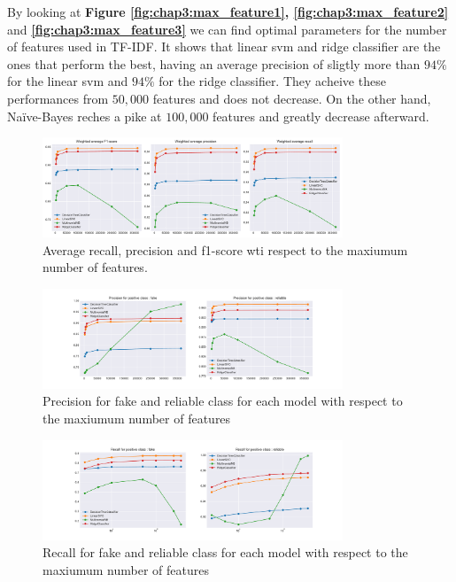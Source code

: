 By looking at \textbf{Figure \ref{fig:chap3:max_feature1}, \ref{fig:chap3:max_feature2}} and \textbf{\ref{fig:chap3:max_feature3}} we can find optimal parameters for the number of features used in TF-IDF. It shows that linear svm and ridge classifier are the ones that perform the best, having an average precision of sligtly more than $94\%$ for the linear svm and $94\%$ for the ridge classifier. They acheive these performances from $50,000$ features and does not decrease. On the other hand, Na\"{i}ve-Bayes reches a pike at $100,000$ features and greatly decrease afterward. \\

\begin{figure}
	\centering
	\includegraphics[width=0.8\textwidth]{images/chapitre3/ML_fake_average}
	\caption{Average recall, precision and f1-score wti respect to the maxiumum number of features.}
	\label{fig:chap3:max_feat1}
\end{figure}
\begin{figure}
	\centering
	\includegraphics[width=0.8\textwidth]{images/chapitre3/ML_fake_precision}
	\caption{Precision for fake and reliable class for each model with respect to the maxiumum number of features}
	\label{fig:chap3:max_feat2}
\end{figure}
\begin{figure}
	\centering
	\includegraphics[width=0.8\textwidth]{images/chapitre3/ML_fake_recall}
	\caption{Recall for fake and reliable class for each model with respect to the maxiumum number of features}
	\label{fig:chap3:max_feat3}
\end{figure}


